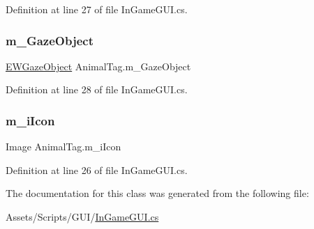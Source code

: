 Definition at line 27 of file In\+Game\+G\+U\+I.\+cs.

\mbox{\label{class_animal_tag_ad59322b0f61cb02af3cf4bfe611af536}} 
\subsubsection{\texorpdfstring{m\+\_\+\+Gaze\+Object}{m\_GazeObject}}
{\footnotesize\ttfamily \mbox{\hyperlink{class_e_w_gaze_object}{E\+W\+Gaze\+Object}} Animal\+Tag.\+m\+\_\+\+Gaze\+Object}



Definition at line 28 of file In\+Game\+G\+U\+I.\+cs.

\mbox{\label{class_animal_tag_ab0d559236d6dc058bfdfb801e1042534}} 
\subsubsection{\texorpdfstring{m\+\_\+i\+Icon}{m\_iIcon}}
{\footnotesize\ttfamily Image Animal\+Tag.\+m\+\_\+i\+Icon}



Definition at line 26 of file In\+Game\+G\+U\+I.\+cs.



The documentation for this class was generated from the following file\+:\begin{DoxyCompactItemize}
\item 
Assets/\+Scripts/\+G\+U\+I/\mbox{\hyperlink{_in_game_g_u_i_8cs}{In\+Game\+G\+U\+I.\+cs}}\end{DoxyCompactItemize}
